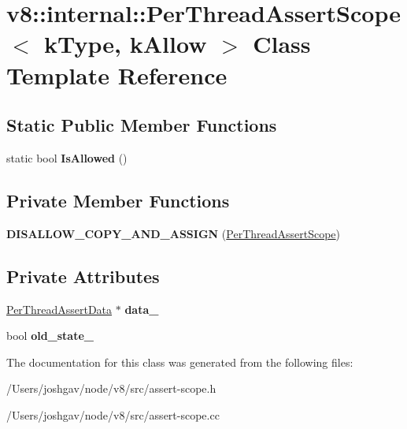 \hypertarget{classv8_1_1internal_1_1_per_thread_assert_scope}{}\section{v8\+:\+:internal\+:\+:Per\+Thread\+Assert\+Scope$<$ k\+Type, k\+Allow $>$ Class Template Reference}
\label{classv8_1_1internal_1_1_per_thread_assert_scope}
\subsection*{Static Public Member Functions}
\begin{DoxyCompactItemize}
\item 
static bool {\bfseries Is\+Allowed} ()\hypertarget{classv8_1_1internal_1_1_per_thread_assert_scope_a3ca2150bfbb1706a8ed30b3caad7a604}{}\label{classv8_1_1internal_1_1_per_thread_assert_scope_a3ca2150bfbb1706a8ed30b3caad7a604}

\end{DoxyCompactItemize}
\subsection*{Private Member Functions}
\begin{DoxyCompactItemize}
\item 
{\bfseries D\+I\+S\+A\+L\+L\+O\+W\+\_\+\+C\+O\+P\+Y\+\_\+\+A\+N\+D\+\_\+\+A\+S\+S\+I\+GN} (\hyperlink{classv8_1_1internal_1_1_per_thread_assert_scope}{Per\+Thread\+Assert\+Scope})\hypertarget{classv8_1_1internal_1_1_per_thread_assert_scope_a1ab4531bc9ad406d7afc6319b07d92fa}{}\label{classv8_1_1internal_1_1_per_thread_assert_scope_a1ab4531bc9ad406d7afc6319b07d92fa}

\end{DoxyCompactItemize}
\subsection*{Private Attributes}
\begin{DoxyCompactItemize}
\item 
\hyperlink{classv8_1_1internal_1_1_per_thread_assert_data}{Per\+Thread\+Assert\+Data} $\ast$ {\bfseries data\+\_\+}\hypertarget{classv8_1_1internal_1_1_per_thread_assert_scope_a5e32f38829f3c6c9e34c1ea20eb2b8e9}{}\label{classv8_1_1internal_1_1_per_thread_assert_scope_a5e32f38829f3c6c9e34c1ea20eb2b8e9}

\item 
bool {\bfseries old\+\_\+state\+\_\+}\hypertarget{classv8_1_1internal_1_1_per_thread_assert_scope_a4a2b71dec3c7fb9a761352fa66b9bfd3}{}\label{classv8_1_1internal_1_1_per_thread_assert_scope_a4a2b71dec3c7fb9a761352fa66b9bfd3}

\end{DoxyCompactItemize}


The documentation for this class was generated from the following files\+:\begin{DoxyCompactItemize}
\item 
/\+Users/joshgav/node/v8/src/assert-\/scope.\+h\item 
/\+Users/joshgav/node/v8/src/assert-\/scope.\+cc\end{DoxyCompactItemize}
